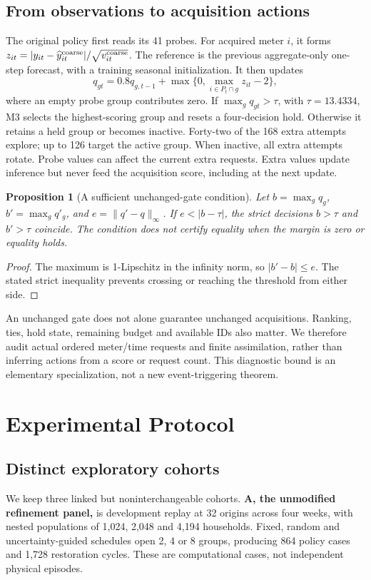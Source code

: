 \documentclass[conference]{IEEEtran}
\newtheorem{proposition}{Proposition}
\begin{document}
\subsection{From observations to acquisition actions}
The original policy first reads its 41 probes. For acquired meter $i$, it forms $z_{it}=|y_{it}-\widehat y^{\rm coarse}_{it}|/\sqrt{v^{\rm coarse}_{it}}$. The reference is the previous aggregate-only one-step forecast, with a training seasonal initialization. It then updates
\begin{equation}
q_{gt}=0.8q_{g,t-1}+\max\{0,\max_{i\in P_t\cap g}z_{it}-2\},\label{eq:score}
\end{equation}
where an empty probe group contributes zero. If $\max_gq_{gt}>\tau$, with $\tau=13.4334$, M3 selects the highest-scoring group and resets a four-decision hold. Otherwise it retains a held group or becomes inactive. Forty-two of the 168 extra attempts explore; up to 126 target the active group. When inactive, all extra attempts rotate. Probe values can affect the current extra requests. Extra values update inference but never feed the acquisition score, including at the next update.

\begin{proposition}[A sufficient unchanged-gate condition]
Let $b=\max_gq_g$, $b'=\max_gq'_g$, and $e=\|q'-q\|_\infty$. If $e<|b-\tau|$, the strict decisions $b>\tau$ and $b'>\tau$ coincide. The condition does not certify equality when the margin is zero or equality holds.
\end{proposition}
\begin{proof}
The maximum is 1-Lipschitz in the infinity norm, so $|b'-b|\le e$. The stated strict inequality prevents crossing or reaching the threshold from either side.
\end{proof}

An unchanged gate does not alone guarantee unchanged acquisitions. Ranking, ties, hold state, remaining budget and available IDs also matter. We therefore audit actual ordered meter/time requests and finite assimilation, rather than inferring actions from a score or request count. This diagnostic bound is an elementary specialization, not a new event-triggering theorem.

\section{Experimental Protocol}
\subsection{Distinct exploratory cohorts}
We keep three linked but noninterchangeable cohorts. \textbf{A, the unmodified refinement panel,} is development replay at 32 origins across four weeks, with nested populations of 1,024, 2,048 and 4,194 households. Fixed, random and uncertainty-guided schedules open 2, 4 or 8 groups, producing 864 policy cases and 1,728 restoration cycles. These are computational cases, not independent physical episodes.
\end{document}
